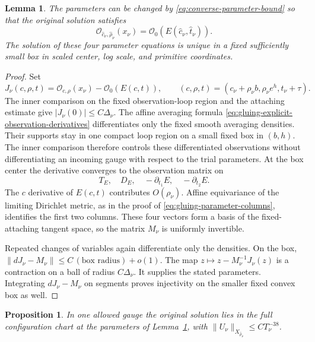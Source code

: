 \documentclass[11pt]{amsart}
\newtheorem{proposition}[theorem]{Proposition}
\newtheorem{lemma}[theorem]{Lemma}
\theoremstyle{definition}
\theoremstyle{remark}
\theoremstyle{plain}
\begin{document}
\begin{lemma}\label{lem:converse-exact-parameters}
The parameters can be changed by
\eqref{eq:converse-parameter-bound} so that the original solution
satisfies
\begin{equation}\label{eq:converse-exact-observations}
 \mathcal O_{\widehat c_\nu,\widehat\rho_\nu}(x_\nu)
            =\mathcal O_0(E(\widehat c_\nu,\widehat t_\nu)).
\end{equation}
The solution of these four parameter equations is unique in
a fixed sufficiently small box in scaled center, log scale,
and primitive coordinates.
\end{lemma}

\begin{proof}
Set
\[
 J_\nu(c,\rho,t)=\mathcal O_{c,\rho}(x_\nu)-\mathcal O_0(E(c,t)),
 \qquad (c,\rho,t)=(c_\nu+\rho_\nu b,\rho_\nu e^h,t_\nu+\tau).
\]
The inner comparison on the fixed observation-loop region
and the attaching estimate give $|J_\nu(0)|\leq C\Delta_\nu$.
The affine averaging formula
\eqref{eq:gluing-explicit-observation-derivatives}
differentiates only the fixed smooth averaging densities.
Their supports stay in one compact loop region on a small
fixed box in $(b,h)$. The inner comparison therefore controls
these differentiated observations without differentiating an
incoming gauge with respect to the trial parameters.
At the box center the derivative converges to the observation
matrix on
\[
 T_E,\quad D_E,\quad-\partial_{t_1}E,\quad-\partial_{t_2}E .
\]
The $c$ derivative of $E(c,t)$ contributes $O(\rho_\nu)$.
Affine equivariance of the limiting Dirichlet metric, as in
the proof of \eqref{eq:gluing-parameter-columns}, identifies
the first two columns. These four vectors form a basis of
the fixed-attaching tangent space, so the matrix $M_\nu$
is uniformly invertible.

Repeated changes of variables again differentiate only the
densities. On the box,
$\|dJ_\nu-M_\nu\|\leq C\,(\text{box radius})+o(1)$.
The map $z\mapsto z-M_\nu^{-1}J_\nu(z)$ is a contraction
on a ball of radius $C\Delta_\nu$. It supplies the stated
parameters. Integrating $dJ_\nu-M_\nu$ on segments proves
injectivity on the smaller fixed convex box as well.
\end{proof}

\begin{proposition}\label{prop:converse-chart-entry}
In one allowed gauge the original solution lies in the full
configuration chart at the parameters of
Lemma~\ref{lem:converse-exact-parameters}, with
$\|U_\nu\|_{X_{\widehat\rho_\nu}}\leq CT_\nu^{-38}$.
\end{proposition}
\end{document}
